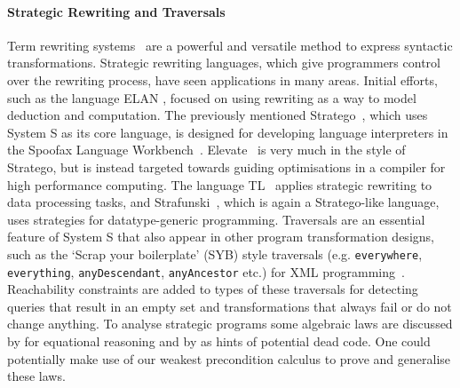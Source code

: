 \paragraph*{Strategic Rewriting and Traversals}
Term rewriting systems~\citep{DBLP:journals/iandc/Dershowitz85} are a powerful and versatile method to express syntactic transformations. Strategic rewriting languages, which give programmers control over the rewriting process, have seen applications in many areas. Initial efforts, such as the language ELAN \citep{DBLP:journals/entcs/BorovanskyKKMV96}, focused on using rewriting as a way to model deduction and computation. The previously mentioned Stratego~\citep{DBLP:conf/icfp/VisserBT98,10.1007/3-540-45127-7_27, DBLP:journals/scp/BravenboerKVV08}, which uses System S as its core language, is designed for developing language interpreters in the Spoofax Language Workbench~\citep{DBLP:journals/software/WachsmuthKV14}.
Elevate~\citep{DBLP:journals/cacm/HagedornLKQGS23,DBLP:journals/pacmpl/HagedornLKQGS20} is very much in the style of Stratego, but is instead targeted towards guiding optimisations in a compiler for high performance computing. The language TL~\citep{DBLP:journals/scp/WinterS04} applies strategic rewriting to data processing tasks, and Strafunski~\citep{DBLP:conf/rule/LammelV02}, which is again a Stratego-like language, uses strategies for datatype-generic programming. Traversals are an essential feature of System S that also appear in other program transformation designs, such as the `Scrap your boilerplate' (SYB) style traversals (e.g. \texttt{everywhere}, \texttt{everything}, \texttt{anyDescendant}, \texttt{anyAncestor} etc.) for XML programming~\citep{10.1145/1190216.1190240}. Reachability constraints are added to types of these traversals for detecting queries that result in an empty set and transformations that always fail or do not change anything. To analyse strategic programs some algebraic laws are discussed by \citet{10.1145/1244381.1244385} for equational reasoning and by \citet{lammel2013programming} as hints of potential dead code. One could potentially make use of our weakest precondition calculus to prove and generalise these laws.

